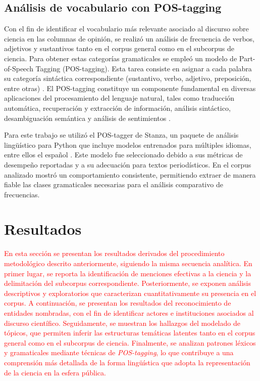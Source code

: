 \documentclass[11pt,a4paper]{article}
\begin{document}
	\subsection{Análisis de vocabulario con POS-tagging}
	Con el fin de identificar el vocabulario más relevante asociado al discurso sobre ciencia en las columnas de opinión, se realizó un análisis de frecuencia de verbos, adjetivos y sustantivos tanto en el corpus general como en el subcorpus de ciencia. Para obtener estas categorías gramaticales se empleó un modelo de Part-of-Speech Tagging (POS-tagging). Esta tarea consiste en asignar a cada palabra su categoría sintáctica correspondiente (sustantivo, verbo, adjetivo, preposición, entre otras) \cite{he2020surveyrecentadvancessequence}. El POS-tagging constituye un componente fundamental en diversas aplicaciones del procesamiento del lenguaje natural, tales como traducción automática, recuperación y extracción de información, análisis sintáctico, desambiguación semántica y análisis de sentimientos \cite{Chiche2022}.
	
	Para este trabajo se utilizó el POS-tagger de Stanza, un paquete de análisis lingüístico para Python que incluye modelos entrenados para múltiples idiomas, entre ellos el español \cite{qi2020stanzapythonnaturallanguage}. Este modelo fue seleccionado debido a sus métricas de desempeño reportadas y a su adecuación para textos periodísticos. En el corpus analizado mostró un comportamiento consistente, permitiendo extraer de manera fiable las clases gramaticales necesarias para el análisis comparativo de frecuencias.
	
	\section{Resultados}


\textcolor{red}{En esta sección se presentan los resultados derivados del procedimiento metodológico descrito anteriormente, siguiendo la misma secuencia analítica. En primer lugar, se reporta la identificación de menciones efectivas a la ciencia y la delimitación del subcorpus correspondiente. Posteriormente, se exponen análisis descriptivos y exploratorios que caracterizan cuantitativamente su presencia en el corpus. A continuación, se presentan los resultados del reconocimiento de entidades nombradas, con el fin de identificar actores e instituciones asociados al discurso científico. Seguidamente, se muestran los hallazgos del modelado de tópicos, que permiten inferir las estructuras temáticas latentes tanto en el corpus general como en el subcorpus de ciencia. Finalmente, se analizan patrones léxicos y gramaticales mediante técnicas de \emph{POS-tagging}, lo que contribuye a una comprensión más detallada de la forma lingüística que adopta la representación de la ciencia en la esfera pública.}
\end{document}
